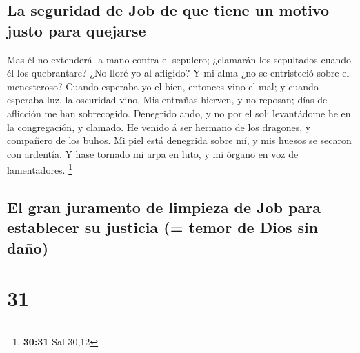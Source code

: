 \hypertarget{la-seguridad-de-job-de-que-tiene-un-motivo-justo-para-quejarse}{%
\subsection{La seguridad de Job de que tiene un motivo justo para
quejarse}\label{la-seguridad-de-job-de-que-tiene-un-motivo-justo-para-quejarse}}

 Mas él no extenderá la mano contra el sepulcro;
¿clamarán los sepultados cuando él los quebrantare?  ¿No
lloré yo al afligido? Y mi alma ¿no se entristeció sobre el menesteroso?
 Cuando esperaba yo el bien, entonces vino el mal; y
cuando esperaba luz, la oscuridad vino.  Mis entrañas
hierven, y no reposan; días de aflicción me han sobrecogido.
 Denegrido ando, y no por el sol: levantádome he en la
congregación, y clamado.  He venido á ser hermano de los
dragones, y compañero de los buhos.  Mi piel está
denegrida sobre mí, y mis huesos se secaron con ardentía.
 Y hase tornado mi arpa en luto, y mi órgano en voz de
lamentadores. \footnote{\textbf{30:31} Sal 30,12}

\hypertarget{el-gran-juramento-de-limpieza-de-job-para-establecer-su-justicia-temor-de-dios-sin-dauxf1o}{%
\subsection{El gran juramento de limpieza de Job para establecer su
justicia (= temor de Dios sin
daño)}\label{el-gran-juramento-de-limpieza-de-job-para-establecer-su-justicia-temor-de-dios-sin-dauxf1o}}

\hypertarget{section-30}{%
\section{31}\label{section-30}}

